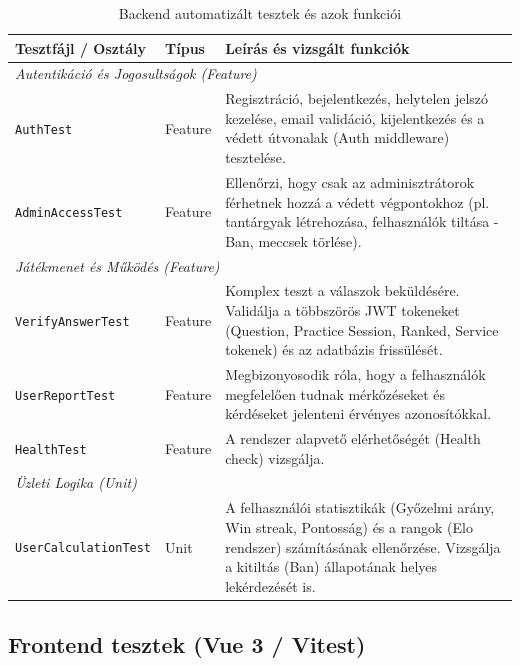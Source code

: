 \begin{table}[h!]
    \centering
    \small
    \begin{tabularx}{\textwidth}{|l|X|X|}
        \hline
        \rowcolor[HTML]{EFEFEF} 
        \textbf{Tesztfájl / Osztály} & \textbf{Típus} & \textbf{Leírás és vizsgált funkciók} \\ \hline
        
        \multicolumn{3}{|l|}{\cellcolor[HTML]{F5F5F5}\textit{Autentikáció és Jogosultságok (Feature)}} \\ \hline
        \texttt{AuthTest} & Feature & Regisztráció, bejelentkezés, helytelen jelszó kezelése, email validáció, kijelentkezés és a védett útvonalak (Auth middleware) tesztelése. \\ \hline
        \texttt{AdminAccessTest} & Feature & Ellenőrzi, hogy csak az adminisztrátorok férhetnek hozzá a védett végpontokhoz (pl. tantárgyak létrehozása, felhasználók tiltása - Ban, meccsek törlése). \\ \hline
        
        \multicolumn{3}{|l|}{\cellcolor[HTML]{F5F5F5}\textit{Játékmenet és Működés (Feature)}} \\ \hline
        \texttt{VerifyAnswerTest} & Feature & Komplex teszt a válaszok beküldésére. Validálja a többszörös JWT tokeneket (Question, Practice Session, Ranked, Service tokenek) és az adatbázis frissülését. \\ \hline
        \texttt{UserReportTest} & Feature & Megbizonyosodik róla, hogy a felhasználók megfelelően tudnak mérkőzéseket és kérdéseket jelenteni érvényes azonosítókkal. \\ \hline
        \texttt{HealthTest} & Feature & A rendszer alapvető elérhetőségét (Health check) vizsgálja. \\ \hline

        \multicolumn{3}{|l|}{\cellcolor[HTML]{F5F5F5}\textit{Üzleti Logika (Unit)}} \\ \hline
        \texttt{UserCalculationTest} & Unit & A felhasználói statisztikák (Győzelmi arány, Win streak, Pontosság) és a rangok (Elo rendszer) számításának ellenőrzése. Vizsgálja a kitiltás (Ban) állapotának helyes lekérdezését is. \\ \hline
    \end{tabularx}
    \caption{Backend automatizált tesztek és azok funkciói}
\end{table}

\subsection{Frontend tesztek (Vue 3 / Vitest)}

